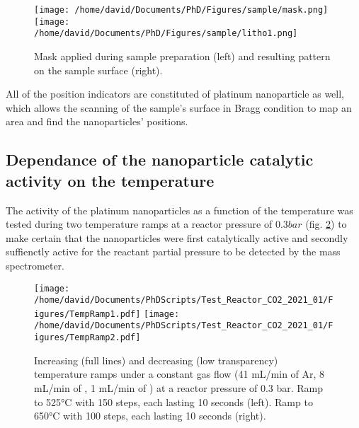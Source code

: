 \begin{figure}[!htb]
    \centering
    \texttt{[image: /home/david/Documents/PhD/Figures/sample/mask.png]}
    \texttt{[image: /home/david/Documents/PhD/Figures/sample/litho1.png]}
    \caption{
    	Mask applied during sample preparation (left) and resulting pattern on the sample surface (right).
    }
    \label{fig:Mask}
\end{figure}

All of the position indicators are constituted of platinum nanoparticle as well, which allows the scanning of the sample's surface in Bragg condition to map an area and find the nanoparticles' positions.

\subsection{Dependance of the nanoparticle catalytic activity on the temperature}

The activity of the platinum nanoparticles as a function of the temperature was tested during two temperature ramps at a reactor pressure of $0.3 \si{bar}$ (fig. \ref{fig:TempRamps}) to make certain that the nanoparticles were first catalytically active and secondly suffienctly active for the reactant partial pressure to be detected by the mass spectrometer.

\begin{figure}[!htb]
    \centering
    \texttt{[image: /home/david/Documents/PhDScripts/Test\_Reactor\_CO2\_2021\_01/Figures/TempRamp1.pdf]}
    \texttt{[image: /home/david/Documents/PhDScripts/Test\_Reactor\_CO2\_2021\_01/Figures/TempRamp2.pdf]}
    \caption{
    	Increasing (full lines) and decreasing (low transparency) temperature ramps under a constant gas flow (41 mL/min of Ar, 8 mL/min of \dioxygen, 1 mL/min of \ammonia) at a reactor pressure of 0.3 bar.
    	Ramp to 525°C with 150 steps, each lasting 10 seconds (left).
    	Ramp to 650°C with 100 steps, each lasting 10 seconds (right).
    }
    \label{fig:TempRamps}
\end{figure}



\subsection{}